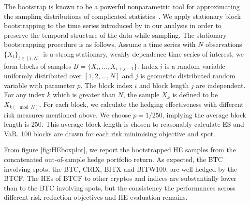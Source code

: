 The bootstrap is known to be a powerful nonparametric tool for approximating the sampling distributions of complicated statistics~\citep{efron1994introduction, davison1997bootstrap}.
We apply stationary block bootstrapping to the time series introduced by \cite{Politis1994} in our analysis in order to preserve the temporal structure of the data while sampling.
The stationary bootstrapping procedure is as follows.
Assume a time series with $N$ observations $\{X_t\}_{t \in [1,N]}$ is a strong stationary, weakly dependence time series of interest,
we form blocks of samples $B = \{X_i, ..., X_{i+j-1}\}$.
Index $i$ is a random variable uniformly distributed over
$[1,2,...,N]$ and $j$ is geometric distributed random variable with parameter $p$.
The block index $i$ and block length $j$ are independent.
For any index $k$ which is greater than $N$, the sample $X_k$ is defined to be $X_{k(\mod N)}$.
For each block, we calculate the hedging effectiveness with different risk measures mentioned above.
We choose $p=1/250$, implying the average block length is 250.
This average block length is chosen to reasonably calculate ES and VaR.
100 blocks are drawn for each risk minimising objective and
spot.

From figure \ref{fig:HEboxplot}, we report the bootstrapped HE samples from the concatenated out-of-sample hedge portfolio return.
As expected, the BTC involving spots, the BTC, CRIX, BITX and BITW100, are well hedged by the BTCF.
The HEs of BTCF to other cryptos and indices are substantially lower than to the BTC involving spots, but the consistency the performances across different risk reduction objectives and HE evaluation remains.



